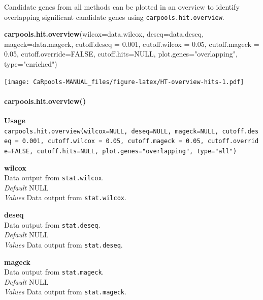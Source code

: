 \documentclass[]{article}
\newenvironment{Shaded}{\begin{snugshade}}{\end{snugshade}}
\newcommand{\KeywordTok}[1]{\textcolor[rgb]{0.13,0.29,0.53}{\textbf{{#1}}}}
\newcommand{\DataTypeTok}[1]{\textcolor[rgb]{0.13,0.29,0.53}{{#1}}}
\newcommand{\FloatTok}[1]{\textcolor[rgb]{0.00,0.00,0.81}{{#1}}}
\newcommand{\StringTok}[1]{\textcolor[rgb]{0.31,0.60,0.02}{{#1}}}
\newcommand{\OtherTok}[1]{\textcolor[rgb]{0.56,0.35,0.01}{{#1}}}
\newcommand{\NormalTok}[1]{{#1}}
\let\oldparagraph\paragraph
\renewcommand{\paragraph}[1]{\oldparagraph{#1}\mbox{}}
\begin{document}
Candidate genes from all methods can be plotted in an overview to
identify overlapping significant candidate genes using
\texttt{carpools.hit.overview}.

\begin{Shaded}
\begin{Highlighting}[]
\KeywordTok{carpools.hit.overview}\NormalTok{(}\DataTypeTok{wilcox=}\NormalTok{data.wilcox, }\DataTypeTok{deseq=}\NormalTok{data.deseq, }\DataTypeTok{mageck=}\NormalTok{data.mageck,}
    \DataTypeTok{cutoff.deseq =} \FloatTok{0.001}\NormalTok{, }\DataTypeTok{cutoff.wilcox =} \FloatTok{0.05}\NormalTok{, }\DataTypeTok{cutoff.mageck =} \FloatTok{0.05}\NormalTok{,}
    \DataTypeTok{cutoff.override=}\OtherTok{FALSE}\NormalTok{, }\DataTypeTok{cutoff.hits=}\OtherTok{NULL}\NormalTok{, }\DataTypeTok{plot.genes=}\StringTok{"overlapping"}\NormalTok{, }\DataTypeTok{type=}\StringTok{"enriched"}\NormalTok{)}
\end{Highlighting}
\end{Shaded}

\texttt{[image: CaRpools-MANUAL\_files/figure-latex/HT-overview-hits-1.pdf]}

\paragraph{carpools.hit.overview()}\label{carpools.hit.overview}

\textbf{Usage}\\
\texttt{carpools.hit.overview(wilcox=NULL,\ deseq=NULL,\ mageck=NULL,\ cutoff.deseq\ =\ 0.001,\ cutoff.wilcox\ =\ 0.05,\ cutoff.mageck\ =\ 0.05,\ cutoff.override=FALSE,\ cutoff.hits=NULL,\ plot.genes="overlapping",\ type="all")}

\textbf{wilcox}\\
Data output from \texttt{stat.wilcox}.\\
\emph{Default} NULL\\
\emph{Values} Data output from \texttt{stat.wilcox}.

\textbf{deseq}\\
Data output from \texttt{stat.deseq}.\\
\emph{Default} NULL\\
\emph{Values} Data output from \texttt{stat.deseq}.

\textbf{mageck}\\
Data output from \texttt{stat.mageck}.\\
\emph{Default} NULL\\
\emph{Values} Data output from \texttt{stat.mageck}.
\end{document}
